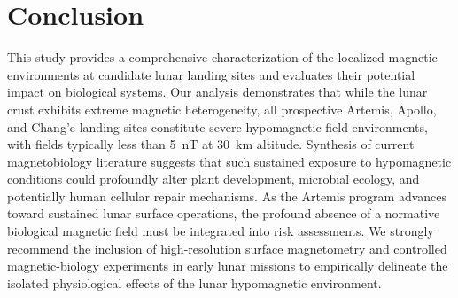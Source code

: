 \section{Conclusion}
\label{sec:conclusion}

This study provides a comprehensive characterization of the localized magnetic environments at candidate lunar landing sites and evaluates their potential impact on biological systems. Our analysis demonstrates that while the lunar crust exhibits extreme magnetic heterogeneity, all prospective Artemis, Apollo, and Chang'e landing sites constitute severe hypomagnetic field environments, with fields typically less than \SI{5}{\nano\tesla} at \SI{30}{\kilo\meter} altitude. Synthesis of current magnetobiology literature suggests that such sustained exposure to hypomagnetic conditions could profoundly alter plant development, microbial ecology, and potentially human cellular repair mechanisms. As the Artemis program advances toward sustained lunar surface operations, the profound absence of a normative biological magnetic field must be integrated into risk assessments. We strongly recommend the inclusion of high-resolution surface magnetometry and controlled magnetic-biology experiments in early lunar missions to empirically delineate the isolated physiological effects of the lunar hypomagnetic environment.
